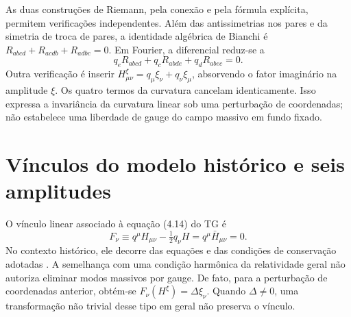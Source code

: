 As duas construções de Riemann, pela conexão e pela fórmula explícita,
permitem verificações independentes. Além das antissimetrias nos pares
e da simetria de troca de pares, a identidade algébrica de Bianchi é
\(R_{abcd}+R_{acdb}+R_{adbc}=0\). Em Fourier, a diferencial reduz-se a
\begin{equation}
 q_eR_{abcd}+q_cR_{abde}+q_dR_{abec}=0.
 \label{eq:fund-bianchi-fourier}
\end{equation}
Outra verificação é inserir
\(H^{\xi}_{\mu\nu}=q_\mu\xi_\nu+q_\nu\xi_\mu\), absorvendo
o fator imaginário na amplitude \(\xi\). Os quatro termos da
curvatura cancelam identicamente. Isso expressa a invariância da
curvatura linear sob uma perturbação de coordenadas; não estabelece uma
liberdade de gauge do campo massivo em fundo fixado.



\section{Vínculos do modelo histórico e seis amplitudes}

O vínculo linear associado à equação (4.14) do TG é
\begin{equation}
 F_\nu\equiv q^\mu H_{\mu\nu}-\tfrac12q_\nu H
          =q^\mu\bar H_{\mu\nu}=0.
 \label{eq:fund-visser-vinculo}
\end{equation}
No contexto histórico, ele decorre das equações e das condições de
conservação adotadas \autocite{visser1998,tg2003}. A semelhança com uma
condição harmônica da relatividade geral não autoriza eliminar modos
massivos por gauge. De fato, para a perturbação de coordenadas
anterior, obtém-se \(F_\nu(H^\xi)=\Delta\xi_\nu\). Quando
\(\Delta\ne0\), uma transformação não trivial desse tipo em geral
não preserva o vínculo.

